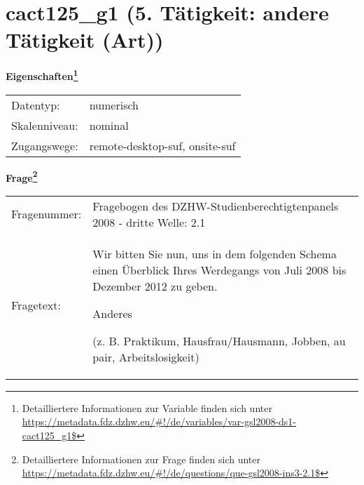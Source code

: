 
    \setcounter{footnote}{0}

    \vspace*{-1.8cm}
	\section{cact125\_g1 (5. Tätigkeit: andere Tätigkeit (Art))}
	\label{section:cact125_g1}



    \vspace*{0.5cm}
    \noindent\textbf{Eigenschaften\footnote{Detailliertere Informationen zur Variable finden sich unter
		\url{https://metadata.fdz.dzhw.eu/\#!/de/variables/var-gsl2008-ds1-cact125_g1$}}}\\
	\begin{tabularx}{\hsize}{@{}lX}
	Datentyp: & numerisch \\
	Skalenniveau: & nominal \\
	Zugangswege: &
	  remote-desktop-suf, 
	  onsite-suf
 \\
    \end{tabularx}



				\vspace*{0.5cm}
                \noindent\textbf{Frage\footnote{Detailliertere Informationen zur Frage finden sich unter
		              \url{https://metadata.fdz.dzhw.eu/\#!/de/questions/que-gsl2008-ins3-2.1$}}}\\
				\begin{tabularx}{\hsize}{@{}lX}
					Fragenummer: &
					  Fragebogen des DZHW-Studienberechtigtenpanels 2008 - dritte Welle:
					  2.1
 \\
					Fragetext: & Wir bitten Sie nun, uns in dem folgenden Schema einen Überblick Ihres Werdegangs von Juli 2008 bis Dezember 2012 zu geben.\par  Anderes\par  (z. B. Praktikum, Hausfrau/Hausmann, Jobben, au pair, Arbeitslosigkeit) \\
				\end{tabularx}





